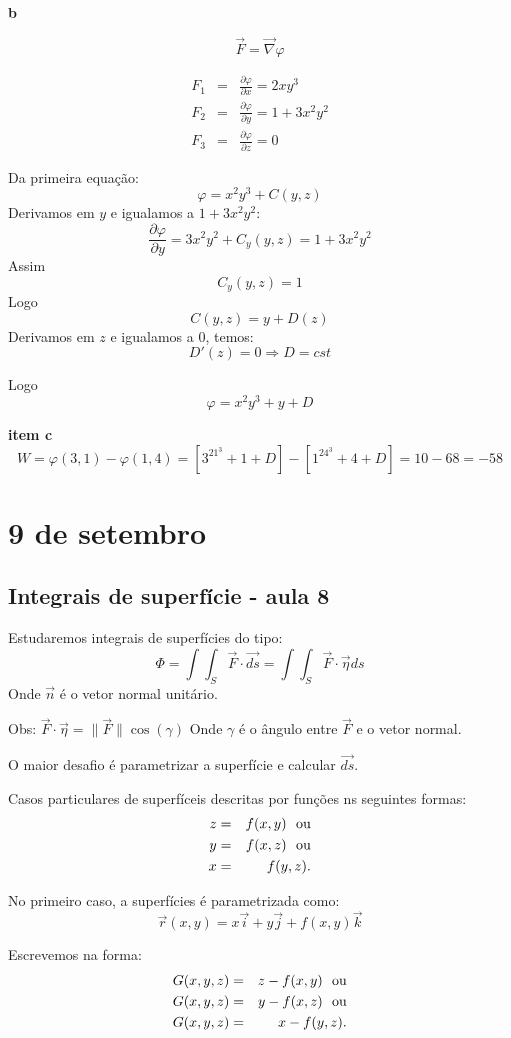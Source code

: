 \documentclass[a4paper,10pt]{book}
\begin{document}
{\bf b}

$$\vec{F}=\vec{\nabla}\varphi$$

\begin{eqnarray*}
 F_1 &=& \frac{\partial \varphi}{\partial x}=2xy^3\\
 F_2 &=& \frac{\partial \varphi}{\partial y}=1+3x^2y^2\\
 F_3 &=& \frac{\partial \varphi}{\partial z}=0
\end{eqnarray*}

Da primeira equação:
$$\varphi=x^2y^3+C(y,z)$$
Derivamos em $y$ e igualamos a $1+3x^2y^2$:
$$\frac{\partial \varphi}{\partial y}=3x^2y^2+C_y(y,z)=1+3x^2y^2$$
Assim
$$C_y(y,z)=1$$
Logo
$$C(y,z)=y+D(z)$$
Derivamos em $z$ e igualamos a $0$, temos:
$$D'(z)=0\Longrightarrow D=cst$$

Logo
$$\varphi=x^2y^3+y+D $$

{\bf item c}
$$W=\varphi(3,1)-\varphi(1,4)=\left[3^21^3+1+D\right]-\left[1^24^3+4+D\right]=10-68=-58$$


\chapter{9 de setembro}

\section{Integrais de superfície - aula 8}
Estudaremos integrais de superfícies do tipo:
$$\Phi = \int\int_S\vec{F}\cdot\vec{ds} = \int\int_S\vec{F}\cdot\vec{\eta}ds$$
Onde $\vec{n}$ é o vetor normal unitário.

Obs: $\vec{F}\cdot\vec{\eta}=\|\vec{F}\|\cos(\gamma)$
Onde $\gamma$ é o ângulo entre $\vec{F}$ e o vetor normal.


O maior desafio é parametrizar a superfície e calcular $\vec{ds}$.
    

Casos particulares de superfíceis descritas por funções ns seguintes formas:
\begin{eqnarray*}
 z&=&f(x,y)  ~~\hbox{ou}\\
 y&=&f(x,z) ~~\hbox{ou}\\
 x&=&f(y,z). 
\end{eqnarray*}

No primeiro caso, a superfícies é parametrizada como:
$$\vec{r}(x,y) = x\vec{i}+y\vec{j}+f(x,y)\vec{k}$$

Escrevemos na forma:
\begin{eqnarray*}
 G(x,y,z)&=&z-f(x,y)  ~~\hbox{ou}\\
 G(x,y,z)&=&y-f(x,z) ~~\hbox{ou}\\
 G(x,y,z)&=&x-f(y,z). 
\end{eqnarray*}
\end{document}
